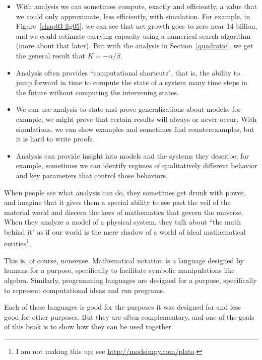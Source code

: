 \documentclass[12pt]{book}
\theoremstyle{exercise}
\begin{document}
\begin{itemize}

\item With analysis we can sometimes compute, exactly and efficiently, a value that we could only approximate, less efficiently, with simulation.  For example, in Figure~\ref{chap03-fig05}, we can see that net growth goes to zero near 14 billion, and we could estimate carrying capacity using a numerical search algorithm (more about that later).  But with the analysis in Section~\ref{quadratic}, we get the general result that $K=-\alpha/\beta$.

\item Analysis often provides ``computational shortcuts", that is, the ability to jump forward in time to compute the state of a system many time steps in the future without computing the intervening states.

\item We can use analysis to state and prove generalizations about models; for example, we might prove that certain results will always or never occur.  With simulations, we can show examples and sometimes find counterexamples, but it is hard to write proofs.

\item Analysis can provide insight into models and the systems they describe; for example, sometimes we can identify regimes of qualitatively different behavior and key parameters that control those behaviors.

\end{itemize}

When people see what analysis can do, they sometimes get drunk with power, and imagine that it gives them a special ability to see past the veil of the material world and discern the laws of mathematics that govern the universe.  When they analyze a model of a physical system, they talk about ``the math behind it" as if our world is the mere shadow of a world of ideal mathematical entities\footnote{I am not making this up; see \url{http://modsimpy.com/plato}.}.

This is, of course, nonsense.  Mathematical notation is a language designed by humans for a purpose, specifically to facilitate symbolic manipulations like algebra.  Similarly, programming languages are designed  for a purpose, specifically to represent computational ideas and run programs.

Each of these languages is good for the purposes it was designed for and less good for other purposes.  But they are often complementary, and one of the goals of this book is to show how they can be used together.
\end{document}
